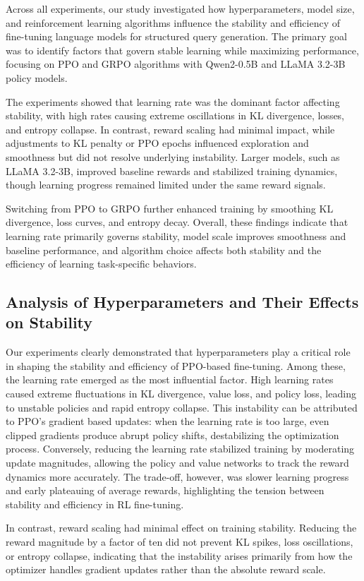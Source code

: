 Across all experiments, our study investigated how hyperparameters, model size, and reinforcement learning algorithms influence the stability and efficiency of fine-tuning language models for structured query generation. The primary goal was to identify factors that govern stable learning while maximizing performance, focusing on PPO and GRPO algorithms with Qwen2-0.5B and LLaMA 3.2-3B policy models.

The experiments showed that learning rate was the dominant factor affecting stability, with high rates causing extreme oscillations in KL divergence, losses, and entropy collapse. In contrast, reward scaling had minimal impact, while adjustments to KL penalty or PPO epochs influenced exploration and smoothness but did not resolve underlying instability. Larger models, such as LLaMA 3.2-3B, improved baseline rewards and stabilized training dynamics, though learning progress remained limited under the same reward signals.

Switching from PPO to GRPO further enhanced training by smoothing KL divergence, loss curves, and entropy decay. Overall, these findings indicate that learning rate primarily governs stability, model scale improves smoothness and baseline performance, and algorithm choice affects both stability and the efficiency of learning task-specific behaviors.

\subsection{Analysis of Hyperparameters and Their Effects on Stability}
Our experiments clearly demonstrated that hyperparameters play a critical role in shaping the stability and efficiency of PPO-based fine-tuning. Among these, the learning rate emerged as the most influential factor. High learning rates caused extreme fluctuations in KL divergence, value loss, and policy loss, leading to unstable policies and rapid entropy collapse. This instability can be attributed to PPO’s gradient based updates: when the learning rate is too large, even clipped gradients produce abrupt policy shifts, destabilizing the optimization process. Conversely, reducing the learning rate stabilized training by moderating update magnitudes, allowing the policy and value networks to track the reward dynamics more accurately. The trade-off, however, was slower learning progress and early plateauing of average rewards, highlighting the tension between stability and efficiency in RL fine-tuning.

In contrast, reward scaling had minimal effect on training stability. Reducing the reward magnitude by a factor of ten did not prevent KL spikes, loss oscillations, or entropy collapse, indicating that the instability arises primarily from how the optimizer handles gradient updates rather than the absolute reward scale.

